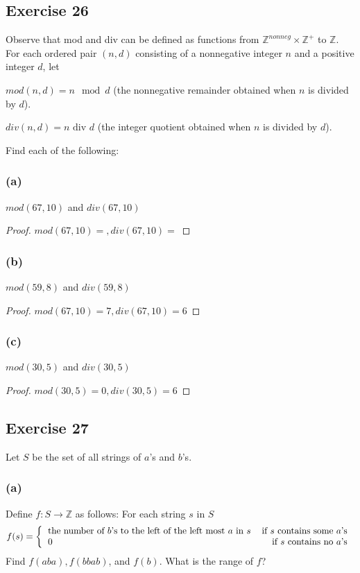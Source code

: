 \documentclass[14pt]{extarticle}
\newcommand{\Z}{\mathbb{Z}}
\begin{document}
\subsection{Exercise 26}
Observe that mod and div can be defined as functions from \(\Z^{nonneg} \times \Z^+\) to $\Z$. For each ordered pair 
\((n, d)\) consisting of a nonnegative integer $n$ and a positive integer $d$, let

\(mod(n, d) = n \mod d\) (the nonnegative remainder obtained when $n$ is divided by $d$).

\(div(n, d) = n \text{ div } d\) (the integer quotient obtained when $n$ is divided by $d$).

Find each of the following:

\subsubsection{(a)}
\(mod(67, 10)\) and \(div(67, 10)\)

\begin{proof}
\(mod(67, 10) = , div(67, 10) = \)
\end{proof}

\subsubsection{(b)}
$mod(59, 8)$ and $div(59, 8)$

\begin{proof}
\(mod(67, 10) = 7, div(67, 10) = 6\)
\end{proof}

\subsubsection{(c)}
$mod(30, 5)$ and $div(30, 5)$

\begin{proof}
\(mod(30, 5) = 0, div(30, 5) = 6\)
\end{proof}

\subsection{Exercise 27}
Let $S$ be the set of all strings of $a$’s and $b$’s.

\subsubsection{(a)}
Define \(f: S \to \Z\) as follows: For each string $s$ in $S$
\[
f(s) =
\left\{
\begin{tabular}{lr}
the number of $b$'s to the left of the left most $a$ in $s$ & if $s$ contains some $a$'s \\
0 & if $s$ contains no $a$'s
\end{tabular}
\right.
\]
Find \(f(aba), f(bbab)\), and \(f(b)\). What is the range of $f$?
\end{document}
